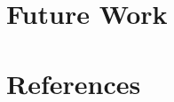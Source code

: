 \documentclass{article}
\begin{document}
\begin{multicols}{2}
\section{Future Work} \label{Future Work}


\section{References} \label{References}
\renewcommand{\section}[2]{}  %


\end{multicols}
\end{document}

